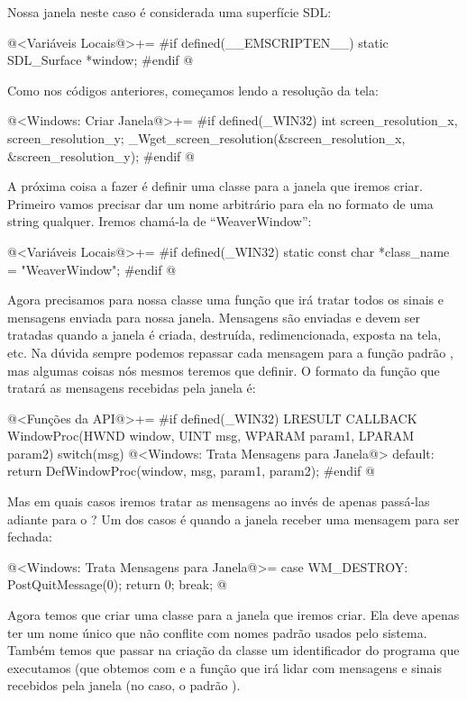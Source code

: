 Nossa janela neste caso é considerada uma superfície SDL:

\iniciocodigo
@<Variáveis Locais@>+=
#if defined(__EMSCRIPTEN__)
static SDL_Surface *window;
#endif
@
\fimcodigo


Como nos códigos anteriores, começamos lendo a resolução da tela:

\iniciocodigo
@<Windows: Criar Janela@>+=
#if defined(_WIN32)
int screen_resolution_x, screen_resolution_y;
_Wget_screen_resolution(&screen_resolution_x, &screen_resolution_y);
#endif
@
\fimcodigo

A próxima coisa a fazer é definir uma classe para a janela que iremos
criar. Primeiro vamos precisar dar um nome arbitrário para ela no
formato de uma string qualquer. Iremos chamá-la de ``WeaverWindow'':

\iniciocodigo
@<Variáveis Locais@>+=
#if defined(_WIN32)
static const char *class_name = "WeaverWindow";
#endif
@
\fimcodigo

Agora precisamos para nossa classe uma função que irá tratar todos os
sinais e mensagens enviada para nossa janela. Mensagens são enviadas e
devem ser tratadas quando a janela é criada, destruída,
redimencionada, exposta na tela, etc. Na dúvida sempre podemos
repassar cada mensagem para a função
padrão , mas algumas coisas nós mesmos
teremos que definir. O formato da função que tratará as mensagens
recebidas pela janela é:

\iniciocodigo
@<Funções da API@>+=
#if defined(_WIN32)
LRESULT CALLBACK WindowProc(HWND window, UINT msg, WPARAM param1, LPARAM param2){
  switch(msg){
    @<Windows: Trata Mensagens para Janela@>
    default:
      return DefWindowProc(window, msg, param1, param2);
  }
}
#endif
@
\fimcodigo

Mas em quais casos iremos tratar as mensagens ao invés de apenas
passá-las adiante para o ? Um dos casos é
quando a janela receber uma mensagem para ser fechada:

\iniciocodigo
@<Windows: Trata Mensagens para Janela@>=
case WM_DESTROY:
  PostQuitMessage(0);
  return 0;
  break;
@
\fimcodigo

Agora temos que criar uma classe para a janela que iremos criar. Ela
deve apenas ter um nome único que não conflite com nomes padrão usados
pelo sistema. Também temos que passar na criação da classe um
identificador do programa que executamos (que obtemos
com  e a função que irá lidar com
mensagens e sinais recebidos pela janela (no
caso, o padrão ).

